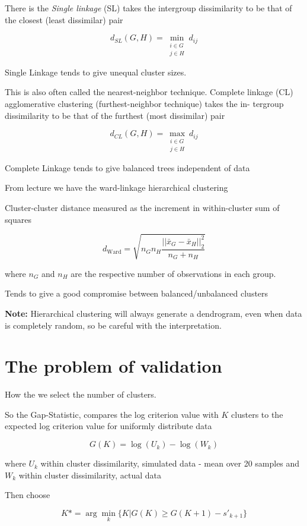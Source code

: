 There is the \textit{Single linkage} (SL) takes the intergroup dissimilarity to be that of the closest (least dissimilar) pair

\[
    d_{SL}(G, H) = \min_{\substack{i \in G \\ j \in H}} d_{ij}
\]

Single Linkage tends to give unequal cluster sizes.

This is also often called the nearest-neighbor technique. Complete linkage
(CL) agglomerative clustering (furthest-neighbor technique) takes the in-
tergroup dissimilarity to be that of the furthest (most dissimilar) pair

\[
    d_{CL}(G, H) = \max_{\substack{i \in G \\ j \in H}} d_{ij}
\]

Complete Linkage tends to give balanced trees independent of data

From lecture \cite[p.~29]{lecture7} we have the ward-linkage hierarchical clustering

Cluster-cluster distance measured as the increment in within-cluster sum of squares

\[
    d_{\text{Ward}} = \sqrt{n_G n_H \frac{||\bar{x}_G - \bar{x}_H||^2_2}{n_G + n_H}}
\]

where $n_G$ and $n_H$ are the respective number of observations in each group.

Tends to give a good compromise
between balanced/unbalanced
clusters

\textbf{Note:} Hierarchical clustering will always generate a dendrogram, even when data is completely random, so be careful with the interpretation.

\section{The problem of validation}

How the we select the number of clusters.

So the Gap-Statistic, compares the log criterion value with $K$ clusters to the expected log criterion value for uniformly distribute data

\[
    G(K) = \log(U_k) - \log(W_k)
\]

where $U_k$ within cluster dissimilarity, simulated data - mean over 20 samples and $W_k$ within cluster dissimilarity, actual data

Then choose

\[
    K* = \arg \min\limits_k \{K | G(K) \geq G(K + 1) - s'_{k+1}\}
\]

